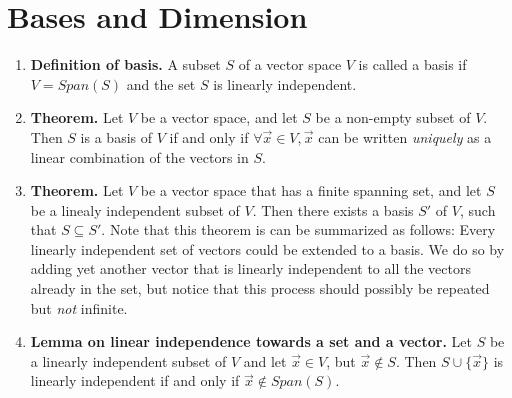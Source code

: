 \documentclass[oneside, 12pt]{book}
\newcommand{\settag}[1]{\renewcommand{\theenumi}{#1}}
\newcommand{\tbf}[1]{\textbf{#1}}
\newcommand{\tit}[1]{\textit{#1}}
\begin{document}
\section{Bases and Dimension}
    \begin{enumerate}
        \settag{1.6.1}
        \item \tbf{Definition of basis.} A subset $S$ of a vector space $V$ is called a basis if $V=Span(S)$ and the set $S$ is linearly independent.
        
        \settag{1.6.3}
        \item \tbf{Theorem. }Let $V$ be a vector space, and let $S$ be a non-empty subset of $V$. Then $S$ is a basis of $V$ if and only if $\forall \vec{x} \in V, \vec{x}$ can be written \tit{uniquely} as a linear combination of the vectors in $S$.
        
        \settag{1.6.6}
        \item \tbf{Theorem. }Let $V$ be a vector space that has a finite spanning set, and let $S$ be a linealy independent subset of $V$. Then there exists a basis $S'$ of $V$, such that $S\subseteq S'.$ Note that this theorem is can be summarized as follows: Every linearly independent set of vectors could be extended to a basis. We do so by adding yet another vector that is linearly independent to all the vectors already in the set, but notice that this process should possibly be repeated but \tit{not} infinite.
        
        \settag{1.6.8}
        \item \tbf{Lemma on linear independence towards a set and a vector.} Let $S$ be a linearly independent subset of $V$ and let $\vec{x}\in V$, but $\vec{x} \notin S$. Then $S\cup \{\vec{x} \}$ is linearly independent if and only if $\vec{x} \notin Span(S)$.
        

\end{enumerate}
\end{document}
